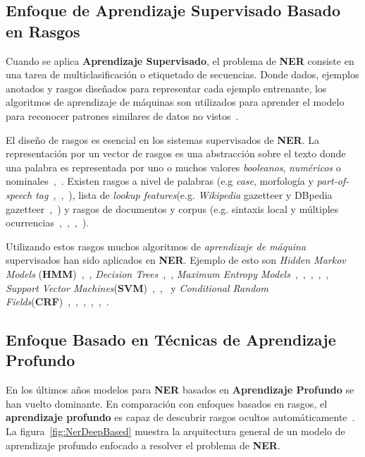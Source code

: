 \subsection{Enfoque de Aprendizaje Supervisado Basado en Rasgos}

Cuando se aplica \textbf{Aprendizaje Supervisado}, el problema de \textbf{NER} consiste en una tarea de multiclasificaci\'on o etiquetado de secuencias. Donde dados, ejemplos anotados y rasgos dise\~nados para representar cada ejemplo entrenante, los algoritmos de aprendizaje de m\'aquinas son utilizados para aprender el modelo para reconocer patrones similares de datos no vistos~\cite{li2018survey}.

El dise\~no de rasgos es esencial en los sistemas supervisados de \textbf{NER}. La representaci\'on por un vector de rasgos es una abstracci\'on sobre el texto donde una palabra es representada por uno o muchos valores \emph{booleanos}, \emph{num\'ericos} o nominales~\cite{nadeau2007survey},~\cite{sekine2009named}. Existen rasgos a nivel de palabras (e.g \emph{case}, morfolog\'ia y \emph{part-of-speech tag}~\cite{zhou2002named},~\cite{settles2004biomedical},~\cite{liao2009simple}), lista de \emph{lookup features}(e.g. \emph{Wikipedia} gazetteer y DBpedia gazetteer~\cite{mikheev1999knowledge},~\cite{hoffart2011robust}) y rasgos de documentos y corpus (e.g. sintaxis local  y m\'ultiples ocurrencias~\cite{ravin1997extracting},~\cite{zhu2005espotter},~\cite{ji2016joint},~\cite{krishnan2006effective}).

Utilizando estos rasgos muchos algoritmos de \emph{aprendizaje de m\'aquina} supervisados han sido aplicados en \textbf{NER}. Ejemplo de esto son \emph{Hidden Markov Models} (\textbf{HMM})~\cite{bikel1997nymble},~\cite{bikel1999algorithm}, \emph{Decision Trees}~\cite{quinlan1986induction},~\cite{szarvas2006multilingual}, \emph{Maximum Entropy Models}~\cite{kapur1989maximum},~\cite{borthwick1998nyu},~\cite{bender2003maximum},~\cite{chieu2002named},~\cite{curran2003language}, \emph{Support Vector Machines}(\textbf{SVM})~\cite{hearst1998support},~\cite{isozaki2002efficient},~\cite{li2004svm} y \emph{Conditional Random Fields}(\textbf{CRF})~\cite{settles2004biomedical},~\cite{lafferty2001conditional},~\cite{mccallum2003early},~\cite{ritter2011named},~\cite{liu2011recognizing},~\cite{rocktaschel2012chemspot}.

\subsection{Enfoque Basado en T\'ecnicas de Aprendizaje Profundo}
En los \'ultimos a\~nos modelos para \textbf{NER} basados en \textbf{Aprendizaje Profundo} se han vuelto dominante. En comparaci\'on con enfoques basados en rasgos, el \textbf{aprendizaje profundo} es capaz de descubrir rasgos ocultos autom\'aticamente~\cite{li2018survey}. La figura~\ref{fig:NerDeepBased} muestra la arquitectura general de un modelo de aprendizaje profundo enfocado a resolver el problema de \textbf{NER}. 

